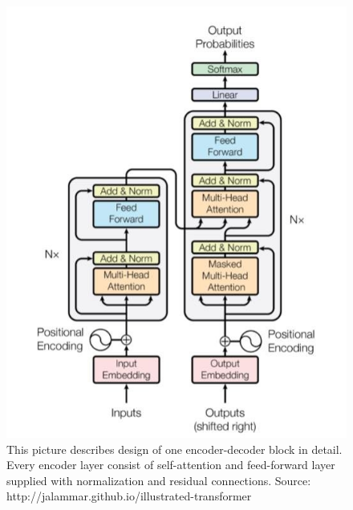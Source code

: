 \begin{figure}[ht]
\centering
\includegraphics[width=1\columnwidth]{../img/trans_arch}
\protect\caption{This picture describes design of one encoder-decoder block in detail. Every encoder layer consist of self-attention and feed-forward layer supplied with normalization and residual connections. Source: http://jalammar.github.io/illustrated-transformer }
\label{pic:enco_deco}
\end{figure}


